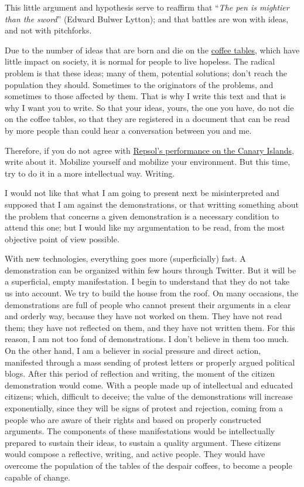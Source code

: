 \documentclass[]{book}
\begin{document}
This little argument and hypothesis serve to reaffirm that ``\emph{The pen is mightier than the sword}'' (Edward Bulwer Lytton); and that battles are won with ideas, and not with pitchforks.

Due to the number of ideas that are born and die on the \href{https://reflexiona-handwritten.blogspot.com/2014/04/cafes-desesperanzadores.html}{coffee tables}, which have little impact on society, it is normal for people to live hopeless. The radical problem is that these ideas; many of them, potential solutions; don't reach the population they should. Sometimes to the originators of the problems, and sometimes to those affected by them. That is why I write this text and that is why I want you to write. So that your ideas, yours, the one you have, do not die on the coffee tables, so that they are registered in a document that can be read by more people than could hear a conversation between you and me.

Therefore, if you do not agree with \href{https://en.wikipedia.org/wiki/Repsol\#Canary_Islands}{Repsol's performance on the Canary Islands}, write about it. Mobilize yourself and mobilize your environment. But this time, try to do it in a more intellectual way. Writing.

I would not like that what I am going to present next be misinterpreted and supposed that I am against the demonstrations, or that writting something about the problem that concerns a given demonstration is a necessary condition to attend this one; but I would like my argumentation to be read, from the most objective point of view possible.

With new technologies, everything goes more (superficially) fast. A demonstration can be organized within few hours through Twitter. But it will be a superficial, empty manifestation. I begin to understand that they do not take us into account. We try to build the house from the roof. On many occasions, the demonstrations are full of people who cannot present their arguments in a clear and orderly way, because they have not worked on them. They have not read them; they have not reflected on them, and they have not written them. For this reason, I am not too fond of demonstrations. I don't believe in them too much. On the other hand, I am a believer in social pressure and direct action, manifested through a mass sending of protest letters or properly argued political blogs. After this period of reflection and writing, the moment of the citizen demonstration would come. With a people made up of intellectual and educated citizens; which, difficult to deceive; the value of the demonstrations will increase exponentially, since they will be signs of protest and rejection, coming from a people who are aware of their rights and based on properly constructed arguments. The components of these manifestations would be intellectually prepared to sustain their ideas, to sustain a quality argument. These citizens would compose a reflective, writing, and active people. They would have overcome the population of the tables of the despair coffees, to become a people capable of change.
\end{document}
